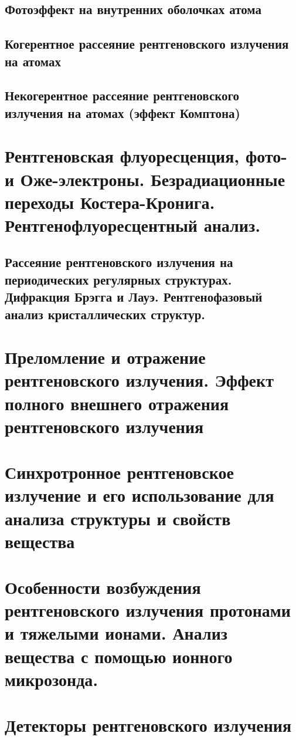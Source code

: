 \documentclass[a4paper,14pt, openany, twoside, draft]{extbook} %
\begin{document}
\section{Фотоэффект на внутренних оболочках атома}
\section{Когерентное рассеяние рентгеновского излучения на атомах}
\section{Некогерентное рассеяние рентгеновского излучения на атомах (эффект Комптона)}

\chapter{Рентгеновская флуоресценция, фото- и Оже-электроны. Безрадиационные переходы Костера-Кронига. Рентгенофлуоресцентный анализ.}
\label{cha:xray-analisys}

\section{Рассеяние рентгеновского излучения на периодических регулярных структурах. Дифракция Брэгга и Лауэ. Рентгенофазовый анализ кристаллических структур.}
\label{sec:bragg-diffraction}

\chapter{Преломление и отражение рентгеновского излучения. Эффект полного внешнего отражения рентгеновского излучения}
\label{cha:total-reflection}

\chapter{Синхротронное рентгеновское излучение и его использование для анализа структуры и свойств вещества}
\label{cha:syncrotron}

\chapter{Особенности возбуждения рентгеновского излучения протонами и тяжелыми ионами. Анализ вещества с помощью ионного микрозонда.}
\label{cha:ion-micro}

\chapter{Детекторы рентгеновского излучения}
\label{cha:detectors}
\end{document}

